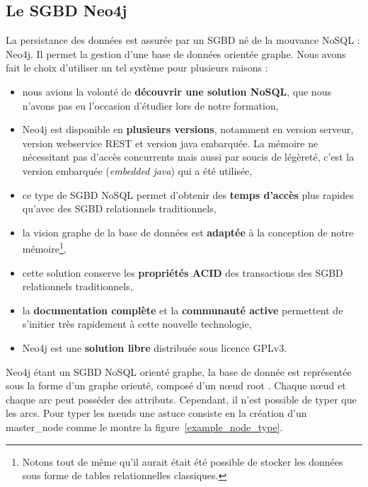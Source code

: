 \subsection{Le \gls{SGBD} Neo4j}

La persistance des données est assurée par un \gls{SGBD} né de la mouvance \gls{NoSQL} : Neo4j. Il permet la gestion d'une base de données orientée graphe. Nous avons fait le choix d'utiliser un tel système pour plusieurs raisons :

\begin{itemize}
\item nous avions la volonté de \textbf{découvrir une solution \gls{NoSQL}}, que nous n'avons pas eu l'occasion d'étudier lors de notre formation,

\item Neo4j est disponible en \textbf{plusieurs versions}, notamment en version serveur, version webservice REST et version java embarquée. La mémoire ne nécessitant pas d'accès concurrents mais aussi par soucis de légèreté, c'est la version embarquée (\emph{embedded java}) qui a été utilisée,

\item ce type de \gls{SGBD} \gls{NoSQL} permet d'obtenir des \textbf{temps d'accès} plus rapides qu'avec des \gls{SGBD} relationnels traditionnels,

\item la vision graphe de la base de données est \textbf{adaptée} à la conception de notre mémoire\footnote{Notons tout de même qu'il aurait était été possible de stocker les données sous forme de tables relationnelles classiques.},

\item cette solution conserve les \textbf{propriétés \gls{ACID}} des transactions des \gls{SGBD} relationnels traditionnels,

\item la \textbf{documentation complète} et la \textbf{communauté active} permettent de s'initier très rapidement à cette nouvelle technologie,

\item Neo4j est une \textbf{solution libre} distribuée sous licence \gls{GPLv3}.
\end{itemize}

Neo4j étant un \gls{SGBD} \gls{NoSQL} orienté graphe, la base de donnée est représentée sous la forme d'un graphe orienté, composé d'un nœud \og root \fg{}. Chaque nœud et chaque arc peut posséder des attributs. Cependant, il n'est possible de typer que les arcs. Pour typer les nœuds une astuce consiste en la création d'un \og master\_node \fg{} comme le montre la figure~\ref{example_node_type}.

